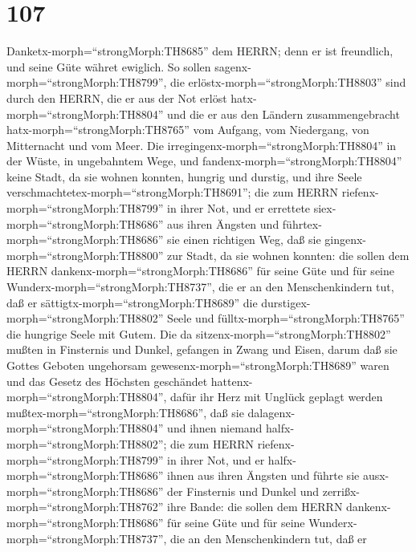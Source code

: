 \hypertarget{section-106}{%
\section{107}\label{section-106}}

 Danketx-morph=``strongMorph:TH8685'' dem HERRN; denn er ist
freundlich, und seine Güte währet ewiglich.  So sollen
sagenx-morph=``strongMorph:TH8799'', die
erlöstx-morph=``strongMorph:TH8803'' sind durch den HERRN, die er aus
der Not erlöst hatx-morph=``strongMorph:TH8804''  und die er
aus den Ländern zusammengebracht hatx-morph=``strongMorph:TH8765'' vom
Aufgang, vom Niedergang, von Mitternacht und vom Meer.  Die
irregingenx-morph=``strongMorph:TH8804'' in der Wüste, in ungebahntem
Wege, und fandenx-morph=``strongMorph:TH8804'' keine Stadt, da sie
wohnen konnten,  hungrig und durstig, und ihre Seele
verschmachtetex-morph=``strongMorph:TH8691'';  die zum HERRN
riefenx-morph=``strongMorph:TH8799'' in ihrer Not, und er errettete
siex-morph=``strongMorph:TH8686'' aus ihren Ängsten  und
führtex-morph=``strongMorph:TH8686'' sie einen richtigen Weg, daß sie
gingenx-morph=``strongMorph:TH8800'' zur Stadt, da sie wohnen konnten:
 die sollen dem HERRN dankenx-morph=``strongMorph:TH8686''
für seine Güte und für seine Wunderx-morph=``strongMorph:TH8737'', die
er an den Menschenkindern tut,  daß er
sättigtx-morph=``strongMorph:TH8689'' die
durstigex-morph=``strongMorph:TH8802'' Seele und
fülltx-morph=``strongMorph:TH8765'' die hungrige Seele mit Gutem.
 Die da sitzenx-morph=``strongMorph:TH8802'' mußten in
Finsternis und Dunkel, gefangen in Zwang und Eisen,  darum
daß sie Gottes Geboten ungehorsam gewesenx-morph=``strongMorph:TH8689''
waren und das Gesetz des Höchsten geschändet
hattenx-morph=``strongMorph:TH8804'',  dafür ihr Herz mit
Unglück geplagt werden mußtex-morph=``strongMorph:TH8686'', daß sie
dalagenx-morph=``strongMorph:TH8804'' und ihnen niemand
halfx-morph=``strongMorph:TH8802'';  die zum HERRN
riefenx-morph=``strongMorph:TH8799'' in ihrer Not, und er
halfx-morph=``strongMorph:TH8686'' ihnen aus ihren Ängsten 
und führte sie ausx-morph=``strongMorph:TH8686'' der Finsternis und
Dunkel und zerrißx-morph=``strongMorph:TH8762'' ihre Bande:
 die sollen dem HERRN dankenx-morph=``strongMorph:TH8686''
für seine Güte und für seine Wunderx-morph=``strongMorph:TH8737'', die
an den Menschenkindern tut,  daß er
